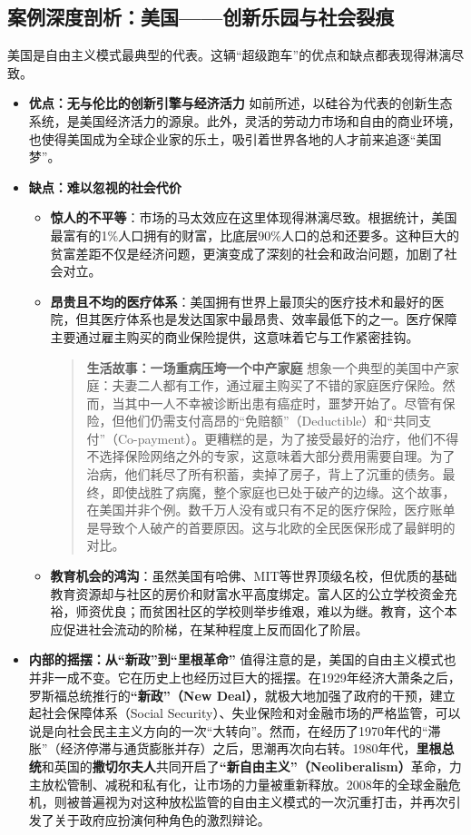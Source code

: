 \subsection{案例深度剖析：美国——创新乐园与社会裂痕}

美国是自由主义模式最典型的代表。这辆“超级跑车”的优点和缺点都表现得淋漓尽致。

\begin{itemize}
\item \textbf{优点：无与伦比的创新引擎与经济活力}
如前所述，以硅谷为代表的创新生态系统，是美国经济活力的源泉。此外，灵活的劳动力市场和自由的商业环境，也使得美国成为全球企业家的乐土，吸引着世界各地的人才前来追逐“美国梦”。
\item \textbf{缺点：难以忽视的社会代价}
\begin{itemize}
\item \textbf{惊人的不平等}：市场的马太效应在这里体现得淋漓尽致。根据统计，美国最富有的1\%人口拥有的财富，比底层90\%人口的总和还要多。这种巨大的贫富差距不仅是经济问题，更演变成了深刻的社会和政治问题，加剧了社会对立。
\item \textbf{昂贵且不均的医疗体系}：美国拥有世界上最顶尖的医疗技术和最好的医院，但其医疗体系也是发达国家中最昂贵、效率最低下的之一。医疗保障主要通过雇主购买的商业保险提供，这意味着它与工作紧密挂钩。
\begin{quote}
\textbf{生活故事：一场重病压垮一个中产家庭}
想象一个典型的美国中产家庭：夫妻二人都有工作，通过雇主购买了不错的家庭医疗保险。然而，当其中一人不幸被诊断出患有癌症时，噩梦开始了。尽管有保险，但他们仍需支付高昂的“免赔额”（Deductible）和“共同支付”（Co-payment）。更糟糕的是，为了接受最好的治疗，他们不得不选择保险网络之外的专家，这意味着大部分费用需要自理。为了治病，他们耗尽了所有积蓄，卖掉了房子，背上了沉重的债务。最终，即使战胜了病魔，整个家庭也已处于破产的边缘。这个故事，在美国并非个例。数千万人没有或只有不足的医疗保险，医疗账单是导致个人破产的首要原因。这与北欧的全民医保形成了最鲜明的对比。
\end{quote}
\item \textbf{教育机会的鸿沟}：虽然美国有哈佛、MIT等世界顶级名校，但优质的基础教育资源却与社区的房价和财富水平高度绑定。富人区的公立学校资金充裕，师资优良；而贫困社区的学校则举步维艰，难以为继。教育，这个本应促进社会流动的阶梯，在某种程度上反而固化了阶层。
\end{itemize}
\item \textbf{内部的摇摆：从“新政”到“里根革命”}
值得注意的是，美国的自由主义模式也并非一成不变。它在历史上也经历过巨大的摇摆。在1929年经济大萧条之后，罗斯福总统推行的\textbf{“新政”（New Deal）}，就极大地加强了政府的干预，建立起社会保障体系（Social Security）、失业保险和对金融市场的严格监管，可以说是向社会民主主义方向的一次“大转向”。然而，在经历了1970年代的“滞胀”（经济停滞与通货膨胀并存）之后，思潮再次向右转。1980年代，\textbf{里根总统}和英国的\textbf{撒切尔夫人}共同开启了\textbf{“新自由主义”（Neoliberalism）}革命，力主放松管制、减税和私有化，让市场的力量被重新释放。2008年的全球金融危机，则被普遍视为对这种放松监管的自由主义模式的一次沉重打击，并再次引发了关于政府应扮演何种角色的激烈辩论。
\end{itemize}

